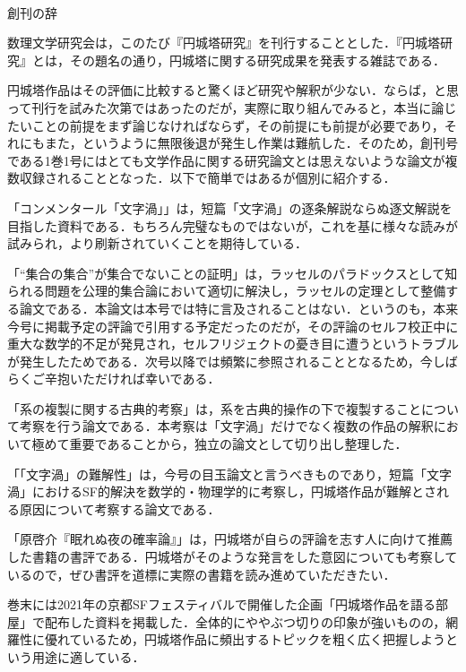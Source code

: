 \documentclass[10pt, a5paper, twoside]{jsarticle}
\theoremstyle{definition}
\begin{document}
	~ %

	\begin{center}

		\Large{創刊の辞}

	\end{center}

	数理文学研究会は，このたび『円城塔研究』を刊行することとした．『円城塔研究』とは，その題名の通り，円城塔に関する研究成果を発表する雑誌である．

	円城塔作品はその評価に比較すると驚くほど研究や解釈が少ない．ならば，と思って刊行を試みた次第ではあったのだが，実際に取り組んでみると，本当に論じたいことの前提をまず論じなければならず，その前提にも前提が必要であり，それにもまた，というように無限後退が発生し作業は難航した．そのため，創刊号である1巻1号にはとても文学作品に関する研究論文とは思えないような論文が複数収録されることとなった．以下で簡単ではあるが個別に紹介する．

	「コンメンタール「文字渦」」は，短篇「文字渦」の逐条解説ならぬ逐文解説を目指した資料である．もちろん完璧なものではないが，これを基に様々な読みが試みられ，より刷新されていくことを期待している．

	「“集合の集合”が集合でないことの証明」は，ラッセルのパラドックスとして知られる問題を公理的集合論において適切に解決し，ラッセルの定理として整備する論文である．本論文は本号では特に言及されることはない．というのも，本来今号に掲載予定の評論で引用する予定だったのだが，その評論のセルフ校正中に重大な数学的不足が発見され，セルフリジェクトの憂き目に遭うというトラブルが発生したためである．次号以降では頻繁に参照されることとなるため，今しばらくご辛抱いただければ幸いである．

	「系の複製に関する古典的考察」は，系を古典的操作の下で複製することについて考察を行う論文である．本考察は「文字渦」だけでなく複数の作品の解釈において極めて重要であることから，独立の論文として切り出し整理した．

	「「文字渦」の難解性」は，今号の目玉論文と言うべきものであり，短篇「文字渦」におけるSF的解決を数学的・物理学的に考察し，円城塔作品が難解とされる原因について考察する論文である．

	「原啓介『眠れぬ夜の確率論』」は，円城塔が自らの評論を志す人に向けて推薦した書籍の書評である．円城塔がそのような発言をした意図についても考察しているので，ぜひ書評を道標に実際の書籍を読み進めていただきたい．

	巻末には2021年の京都SFフェスティバルで開催した企画「円城塔作品を語る部屋」で配布した資料を掲載した．全体的にややぶつ切りの印象が強いものの，網羅性に優れているため，円城塔作品に頻出するトピックを粗く広く把握しようという用途に適している．
\end{document}
